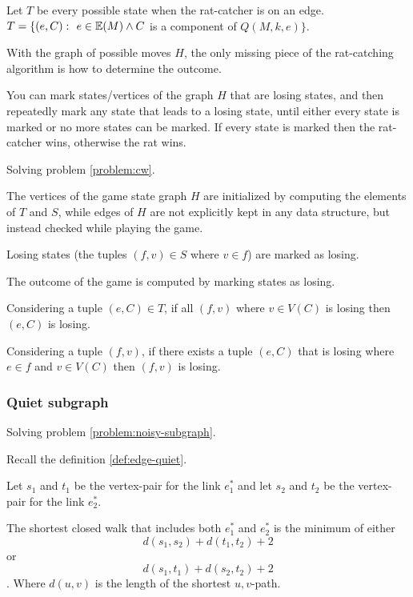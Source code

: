 \documentclass{article}
\begin{document}
		Let $T$ be every possible state when the rat-catcher is on an edge. $T = \{ (e, C) \,\colon\  e \in \mathbb{E}(M) \land C$ is a component of $Q(M, k, e) \}$.
		
		With the graph of possible moves $H$, the only missing piece of the rat-catching algorithm is how to determine the outcome.

		You can mark states/vertices of the graph $H$ that are losing states, and then repeatedly mark any state that leads to a losing state, until either every state is marked or no more states can be marked. If every state is marked then the rat-catcher wins, otherwise the rat wins.

		Solving problem \ref{problem:cw}.

		The vertices of the game state graph $H$ are initialized by computing the elements of $T$ and $S$, while edges of $H$ are not explicitly kept in any data structure, but instead checked while playing the game.

		Losing states (the tuples $(f,v) \in S$ where $v \in f$) are marked as losing.

		The outcome of the game is computed by marking states as losing.
		
		Considering a tuple $(e, C) \in T$, if all $(f, v)$ where $v \in V(C)$ is losing then $(e, C)$ is losing.

		Considering a tuple $(f, v)$, if there exists a tuple $(e, C)$ that is losing where $e \in f$ and $v \in V(C)$ then $(f, v)$ is losing.


		\subsubsection{Quiet subgraph}

			Solving problem \ref{problem:noisy-subgraph}.

			Recall the definition \ref{def:edge-quiet}.

			Let $s_1$ and $t_1$ be the vertex-pair for the link $e_1^*$ and let $s_2$ and $t_2$ be the vertex-pair for the link $e_2^*$.

			\begin{claim}
				The shortest closed walk that includes both $e_1^*$ and $e_2^*$ is the minimum of either $$d(s_1, s_2) + d(t_1, t_2) + 2$$ or $$d(s_1, t_1) + d(s_2, t_2) + 2$$. Where $d(u, v)$ is the length of the shortest $u,v$-path.
			\end{claim}
\end{document}
